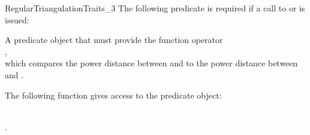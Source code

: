 \begin{ccRefConcept}{RegularTriangulationTraits_3}
The following predicate is required if  a call to
or  is issued: 

{A predicate object that must provide the function operator\\
,\\
which compares the power distance between  and  
to the power distance
between  and .}


\ccOperations

The following function gives access to the predicate object:



\ccHasModels

\\
.

\end{ccRefConcept}
